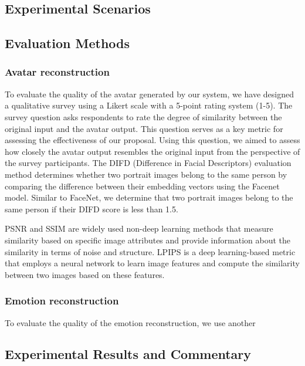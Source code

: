 
\subsection{Experimental Scenarios}


\subsection{Evaluation Methods}
\subsubsection{Avatar reconstruction}
To evaluate the quality of the avatar generated by our system, we have designed a qualitative survey using a Likert scale with a 5-point rating system (1-5). The survey question asks respondents to rate the degree of similarity between the original input and the avatar output. This question serves as a key metric for assessing the effectiveness of our proposal.
Using this question, we aimed to assess how closely the avatar output resembles the original input from the perspective of the survey participants.
The DIFD (Difference in Facial Descriptors) evaluation method determines whether two portrait images belong to the same person by comparing the difference between their embedding vectors using the Facenet model. Similar to FaceNet, we determine that two portrait images belong to the same person if their DIFD score is less than 1.5.

PSNR and SSIM are widely used non-deep learning methods that measure similarity based on specific image attributes and provide information about the similarity in terms of noise and structure.
LPIPS is a deep learning-based metric that employs a neural network to learn image features and compute the similarity between two images based on these features.

\subsubsection{Emotion reconstruction}
To evaluate the quality of the emotion reconstruction, we use another


\subsection{Experimental Results and Commentary}
